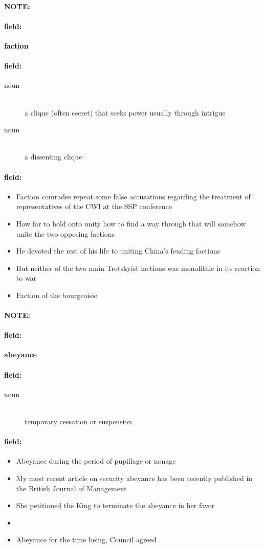 \documentclass[12pt]{article}
\newenvironment{note}{\paragraph{NOTE:}}{}
\newenvironment{field}{\paragraph{field:}}{}
\begin{document}
\begin{note}
\begin{field}
\textbf{\large faction}
\end{field}


\begin{field}
\begin{description}
\item[noun] \hfill \\ 
a clique (often secret) that seeks power usually through intrigue

\item[noun] \hfill \\ 
a dissenting clique

\end{description}
\end{field}

\begin{field}
\begin{itemize}
\item Faction comrades repeat some false accusations regarding the treatment of representatives of the CWI at the SSP conference
\item How far to hold onto unity  how to find a way through that will somehow unite the two opposing factions
\item He devoted the rest of his life to uniting China's feuding factions
\item But neither of the two main Trotskyist factions was monolithic in its reaction to war
\item Faction of the bourgeoisie
\end{itemize}
\end{field}
\end{note}
\begin{note}
\begin{field}
\textbf{\large abeyance}
\end{field}


\begin{field}
\begin{description}
\item[noun] \hfill \\ 
temporary cessation or suspension

\end{description}
\end{field}

\begin{field}
\begin{itemize}
\item Abeyance during the period of pupillage or nonage
\item My most recent article on security abeyance has been recently published in the British Journal of Management
\item She petitioned the King to terminate the abeyance in her favor
\item 
\item Abeyance for the time being, Council agreed
\end{itemize}
\end{field}
\end{note}
\end{document}
